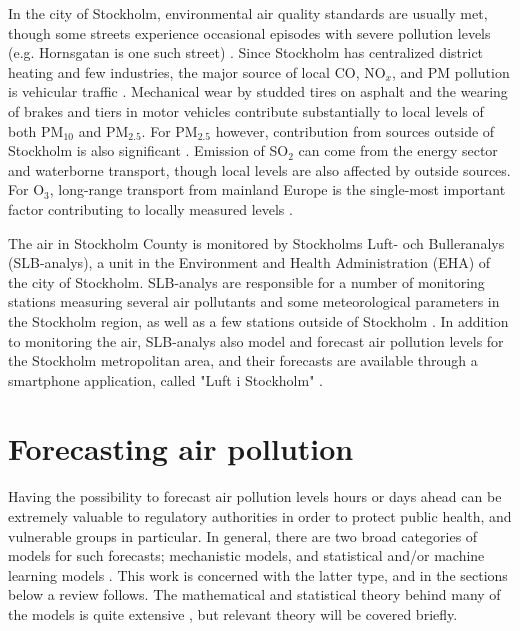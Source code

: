 In the city of Stockholm, environmental air quality standards are usually met, though some streets experience occasional episodes with severe pollution levels (e.g. Hornsgatan is one such street) \cite{slbanalys2021}. Since Stockholm has centralized district heating and few industries, the major source of local CO, NO$_x$, and PM pollution is vehicular traffic \cite{slbanalys, slbanalys2021}. Mechanical wear by studded tires on asphalt and the wearing of brakes and tiers in motor vehicles contribute substantially to local levels of both PM$_{10}$ and PM$_{2.5}$. For PM$_{2.5}$ however, contribution from sources outside of Stockholm is also significant \cite{slbanalys2021}. Emission of SO$_2$ can come from the energy sector and waterborne transport, though local levels are also affected by outside sources. 
For O$_3$, long-range transport from mainland Europe is the single-most important factor contributing to locally measured levels \cite{slbanalys2021}. 

The air in Stockholm County is monitored by Stockholms Luft- och Bulleranalys (SLB-analys), a unit in the Environment and Health Administration (EHA) of the city of Stockholm. SLB-analys are responsible for a number of monitoring stations measuring several air pollutants and some meteorological parameters in the Stockholm region, as well as a few stations outside of Stockholm \cite{slb-matningar}. In addition to monitoring the air, SLB-analys also model and forecast air pollution levels for the Stockholm metropolitan area, and their forecasts are available through a smartphone application, called "Luft i Stockholm" \cite{slbanalys}. 

\section{Forecasting air pollution}

Having the possibility to forecast air pollution levels hours or days ahead can be extremely valuable to regulatory authorities in order to protect public health, and vulnerable groups in particular. In general, there are two broad categories of models for such forecasts; mechanistic models, and statistical and/or machine learning models \cite{ElHarbawi2013}. This work is concerned with the latter type, and in the sections below a review follows. The mathematical and statistical theory behind many of the models is quite extensive \cite{Hastie2009, Montgomery2015, smlbook, LeCun2015}, but relevant theory will be covered briefly.

